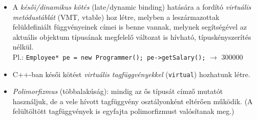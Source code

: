 \begin{frame}
    \begin{itemize}
        \item A \emph{késői/dinamikus kötés} (late/dynamic binding) hatására a fordító \emph{virtuális metódustáblát} (VMT, vtable) hoz létre, melyben a leszármazottak felüldefiniált függvényeinek címei is benne vannak, melynek segítségével az aktuális objektum típusának megfelelő változat is hívható, típuskényszerítés nélkül. \\ Pl.: \texttt{Employee* pe = new Programmer(); pe->getSalary();} $\to$ 300000
        \item C++-ban késői kötést \emph{virtuális tagfüggvényekkel} (\texttt{virtual}) hozhatunk létre.
        \item \emph{Polimorfizmus} (többalakúság): mindig az ős típusát címző mutatót használjuk, de a vele hívott tagfüggvény osztályonként eltérően működik. (A felültöltött tagfüggvények is egyfajta polimorfizmust valósítanak meg.)
    \end{itemize}
\end{frame}

\begin{frame}
    \begin{columns}[T]
            \begin{exampleblock}{}
                \vspace{-.2cm}
                \fontsize{7}{8} \selectfont
                
                \vspace{-.2cm}
            \end{exampleblock}
            \begin{exampleblock}{}
                \vspace{-.2cm}
                \fontsize{7}{8} \selectfont
                
                \vspace{-.2cm}
            \end{exampleblock}
    \end{columns}
\end{frame}

